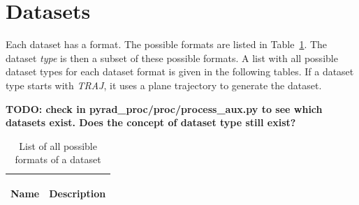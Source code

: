 \documentclass[a4paper,11pt,pdftex,twoside]{scrartcl}
\renewcommand{\bf}{\normalfont \bfseries}
\begin{document}
{{{%
%

\newpage

\section{Datasets}
\label{sec_datasets}

Each dataset has a format. The possible formats are listed in Table~\ref{tab_dataset_formats}. The dataset \emph{type} is then a subset of these possible formats. A list with all possible dataset types for each dataset format is given in the following tables.
If a dataset type starts with \emph{TRAJ}, it uses a plane trajectory to generate the dataset.

{\bf TODO: check in pyrad\_proc/proc/process\_aux.py to see which datasets exist. Does the concept of dataset type still exist?}

\begin{longtable}{p{}p{}}

\caption{List of all possible formats of a dataset}\\
\label{tab_dataset_formats}

\bf{Name}          & \bf{Description}\\
\hline
\endfirsthead


\end{longtable}}}}
\end{document}
